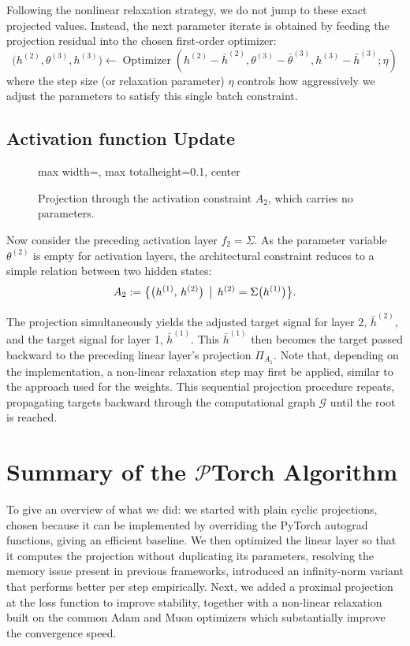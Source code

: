 Following the nonlinear relaxation strategy, we do not jump to these exact projected values. Instead, the next parameter iterate is obtained by feeding the projection residual into the chosen first-order optimizer:
\begin{equation}
\bigl(h^{(2)},\theta^{(3)}, h^{(3)}\bigr) \gets \operatorname{Optimizer}\!\left( {h}^{(2)} - \bar h^{(2)}, {\theta}^{(3)} - \bar \theta^{(3)}, {h}^{(3)} - \bar h^{(3)} ; \eta \right)
\end{equation}
where the step size (or relaxation parameter) $\eta$ controls how aggressively we adjust the parameters to satisfy this single batch constraint. 

\subsection{Activation function Update}
\begin{figure}[htbp]
\centering
\begin{adjustbox}{max width=\textwidth, max totalheight=0.1\textheight, center}

\end{adjustbox}

\caption{Projection through the activation constraint $A_{2}$, which carries no
parameters.}
\label{fig:next_back_prop_mid}
\end{figure}
Now consider the preceding activation layer $f_2 = \Sigma$. As the parameter variable $\theta^{(2)}$ is empty for activation layers, the architectural constraint reduces to a simple relation between two hidden states:
\[
A_{2} := \bigl\{\bigl(h^{(1)},\, h^{(2)}\bigr) \,\bigm|\,
h^{(2)} = \Sigma\bigl(h^{(1)}\bigr) \bigr\}.
\]

The projection simultaneously yields the adjusted target signal for layer 2, $\bar h^{(2)}$, and the target signal for layer 1, $\bar{h}^{(1)}$. This $\bar{h}^{(1)}$ then becomes the target passed backward to the preceding linear layer's projection $\Pi_{A_{1}}$. Note that, depending on the implementation, a non-linear relaxation step may first be applied, similar to the approach used for the weights. This sequential projection procedure repeats, propagating targets backward through the computational graph $\mathcal{G}$ until the root is reached.

\section{Summary of the \texorpdfstring{$\mathcal{P}$Torch}{��Torch} Algorithm}
To give an overview of what we did: we started with plain cyclic projections, chosen because it can be implemented by overriding the PyTorch autograd functions, giving an efficient baseline. We then optimized the linear layer so that it computes the projection without duplicating its parameters, resolving the memory issue present in previous frameworks, introduced an infinity-norm variant that performs better per step empirically. Next, we added a proximal projection at the loss function to improve stability, together with a non-linear relaxation built on the common Adam and Muon optimizers which substantially improve the convergence speed.